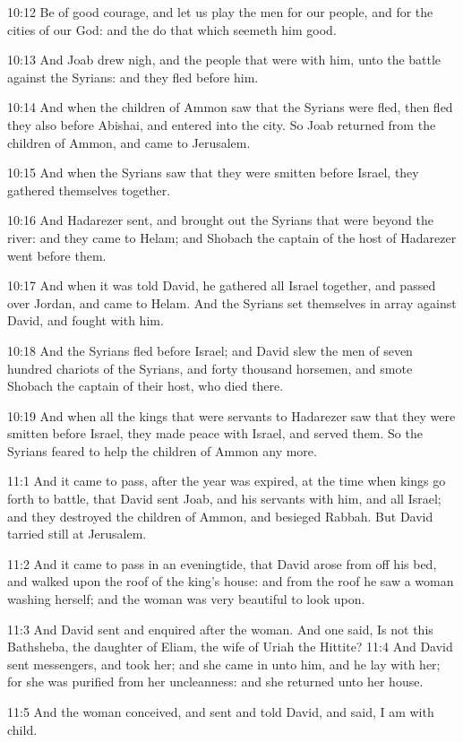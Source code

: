 10:12 Be of good courage, and let us play the men for our people, and for the cities of our God: and the \LORD do that which seemeth him good.

10:13 And Joab drew nigh, and the people that were with him, unto the battle against the Syrians: and they fled before him.

10:14 And when the children of Ammon saw that the Syrians were fled, then fled they also before Abishai, and entered into the city. So Joab returned from the children of Ammon, and came to Jerusalem.

10:15 And when the Syrians saw that they were smitten before Israel, they gathered themselves together.

10:16 And Hadarezer sent, and brought out the Syrians that were beyond the river: and they came to Helam; and Shobach the captain of the host of Hadarezer went before them.

10:17 And when it was told David, he gathered all Israel together, and passed over Jordan, and came to Helam. And the Syrians set themselves in array against David, and fought with him.

10:18 And the Syrians fled before Israel; and David slew the men of seven hundred chariots of the Syrians, and forty thousand horsemen, and smote Shobach the captain of their host, who died there.

10:19 And when all the kings that were servants to Hadarezer saw that they were smitten before Israel, they made peace with Israel, and served them. So the Syrians feared to help the children of Ammon any more.

11:1 And it came to pass, after the year was expired, at the time when kings go forth to battle, that David sent Joab, and his servants with him, and all Israel; and they destroyed the children of Ammon, and besieged Rabbah. But David tarried still at Jerusalem.

11:2 And it came to pass in an eveningtide, that David arose from off his bed, and walked upon the roof of the king's house: and from the roof he saw a woman washing herself; and the woman was very beautiful to look upon.

11:3 And David sent and enquired after the woman. And one said, Is not this Bathsheba, the daughter of Eliam, the wife of Uriah the Hittite?  11:4 And David sent messengers, and took her; and she came in unto him, and he lay with her; for she was purified from her uncleanness: and she returned unto her house.

11:5 And the woman conceived, and sent and told David, and said, I am with child.


